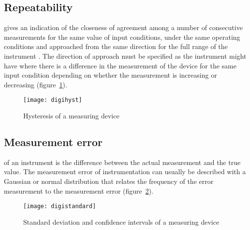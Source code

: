 \subsection{Repeatability}
 gives an indication of the closeness of agreement among a number of consecutive measurements for the same value of input conditions, under the same operating conditions and approached from the same direction for the full range of the instrument \citep[530]{Richardson94}. The direction of approach must be specified as the instrument might have  where there is a difference in the measurement of the device for the same input condition depending on whether the measurement is increasing or decreasing (figure~\ref{fig:digi:hyst}). 				
\begin{figure}[htbp]
	\centering
	\texttt{[image: digihyst]}
	\caption{Hysteresis of a measuring device}
	\label{fig:digi:hyst}
\end{figure}

\subsection{Measurement error}		    
 of an instrument is the difference between the actual measurement and the true 			value. The measurement error of instrumentation can usually be described with a Gaussian or normal 							distribution that relates the frequency of the error measurement to the measurement error 											(figure~\ref{fig:digi:standard}). 
\begin{figure}[htbp]
	\centering
	\texttt{[image: digistandard]}
	\caption{Standard deviation and confidence intervals of a measuring device}
	\label{fig:digi:standard}
\end{figure}
    		
